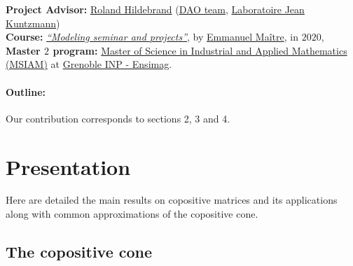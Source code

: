 \documentclass[onecolumn,11pt,a4paper]{article}
\theoremstyle{plain}  %
\theoremstyle{remark}  %
\providecommand*{\hr}[1][class-arg]{%
    \hspace*{\fill}\hrulefill\hspace*{\fill}
    \vskip 0.65\baselineskip
}
\newcommand{\blankpage}{}
\begin{document}
\vfill{}
\begin{center}
    \begin{large}
        \textbf{Project Advisor:} \href{http://www-ljk.imag.fr/membres/Roland.Hildebrand/}{Roland Hildebrand} (\href{http://dao-ljk.imag.fr/}{DAO team}, \href{http://www-ljk.imag.fr/}{Laboratoire Jean Kuntzmann}) \\
        \textbf{Course:}
        \emph{\href{https://chamilo.grenoble-inp.fr/courses/ENSIMAGWMM9AM10/index.php}{``Modeling seminar and projects''}}, by \href{http://www-ljk.imag.fr/membres/Emmanuel.Maitre/doku.php}{Emmanuel Maître}, in $2020$, \\
        \textbf{Master $2$ program: } \href{https://msiam.imag.fr/doku.php}{Master of Science in Industrial and Applied Mathematics (MSIAM)}
        at \href{https://ensimag.grenoble-inp.fr/}{Grenoble INP - Ensimag}. \\
    \end{large}
\end{center}
\newpage

\blankpage

\paragraph{Outline:} 
Our contribution corresponds to sections 2, 3 and 4.\\
\hr{}
\section{Presentation}
\label{sec:presentation}
Here are detailed the main results on copositive matrices and its applications along with common approximations of the copositive cone.
\subsection{The copositive cone}
\label{sub:copositive}
\end{document}
